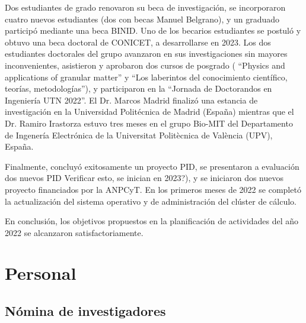 \documentclass[a4paper,11pt,twoside,final,titlepage,onecolumn,openright]{report}
\begin{document}
Dos estudiantes de grado renovaron su beca de investigación, se incorporaron cuatro nuevos estudiantes (dos con becas Manuel Belgrano), y un graduado participó mediante una beca BINID. Uno de los becarios estudiantes se postuló y obtuvo una beca doctoral de CONICET, a desarrollarse en 2023. Los dos estudiantes doctorales del grupo avanzaron en sus investigaciones sin mayores inconvenientes, asistieron y aprobaron dos cursos de posgrado ( ``Physics and applications of granular matter'' y ``Los laberintos del conocimiento científico, teorías, metodologías''), y participaron en la ``Jornada de Doctorandos en Ingeniería UTN 2022''.  El Dr. Marcos Madrid finalizó una estancia de investigación en la Universidad Politécnica de Madrid (España) mientras que el Dr. Ramiro Irastorza estuvo tres meses en el grupo Bio-MIT del Departamento de Ingenería Electrónica de la Universitat Politècnica de València (UPV), España. 

Finalmente, concluyó exitosamente un proyecto PID, se presentaron a evaluación dos nuevos PID {\color{red} Verificar esto, se inician en 2023?)},  y se iniciaron dos nuevos proyecto financiados por la ANPCyT. En los primeros meses de 2022 se completó la actualización del sistema operativo y de administración del clúster de cálculo.

En conclusión, los objetivos propuestos en la planificación de actividades del año 2022 se alcanzaron satisfactoriamente.

\section{Personal}

\subsection{Nómina de investigadores}
\end{document}
